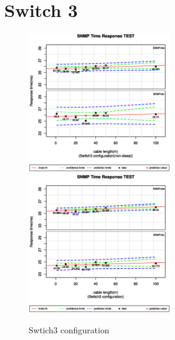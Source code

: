 \documentclass[11pt
  , a4paper
  , article
  , oneside
]{memoir}
\begin{document}
\section{Switch 3}
 \begin{figure}[!htb]
  \centering
  \includegraphics[width=0.55\textwidth]{./images/s3sx.eps}
  \includegraphics[width=0.55\textwidth]{./images/s3s1.eps}
  \caption{Swtich3 configuration}
\end{figure}
\clearpage
\end{document}

